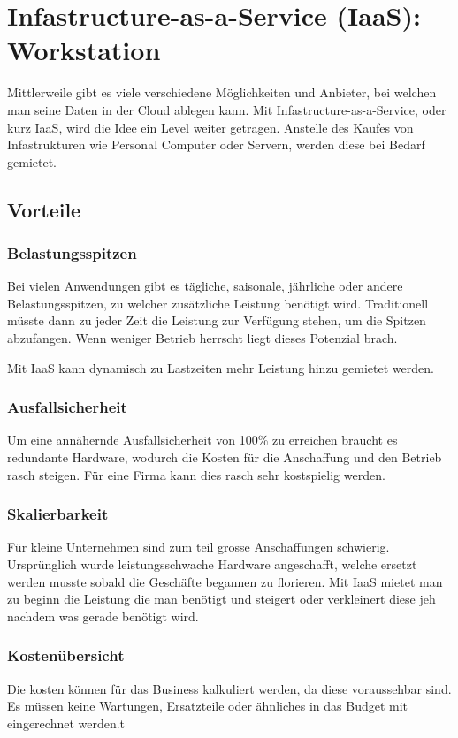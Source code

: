 \section{Infastructure-as-a-Service (IaaS): Workstation}
Mittlerweile gibt es viele verschiedene Möglichkeiten und Anbieter, bei welchen man seine Daten in der Cloud ablegen kann. Mit Infastructure-as-a-Service, oder kurz IaaS, wird die Idee ein Level weiter getragen. 
Anstelle des Kaufes von Infastrukturen wie Personal Computer oder Servern, werden diese bei Bedarf gemietet. 

\subsection{Vorteile}
\subsubsection{Belastungsspitzen}
Bei vielen Anwendungen gibt es tägliche, saisonale, jährliche oder andere Belastungsspitzen, zu welcher zusätzliche Leistung benötigt wird. 
Traditionell müsste dann zu jeder Zeit die Leistung zur Verfügung stehen, um die Spitzen abzufangen. Wenn weniger Betrieb herrscht liegt dieses Potenzial brach.

Mit IaaS kann dynamisch zu Lastzeiten mehr Leistung hinzu gemietet werden.

\subsubsection{Ausfallsicherheit}
Um eine annähernde Ausfallsicherheit von 100\% zu erreichen braucht es redundante Hardware, wodurch die Kosten für die Anschaffung und den Betrieb rasch steigen.
Für eine Firma kann dies rasch sehr kostspielig werden.

\subsubsection{Skalierbarkeit}
Für kleine Unternehmen sind zum teil grosse Anschaffungen schwierig. 
Ursprünglich wurde leistungsschwache Hardware angeschafft, welche ersetzt werden musste sobald die Geschäfte begannen zu florieren. 
Mit IaaS mietet man zu beginn die Leistung die man benötigt und steigert oder verkleinert diese jeh nachdem was gerade benötigt wird.

\subsubsection{Kostenübersicht}
Die kosten können für das Business kalkuliert werden, da diese voraussehbar sind.
Es müssen keine Wartungen, Ersatzteile oder ähnliches in das Budget mit eingerechnet werden.t



